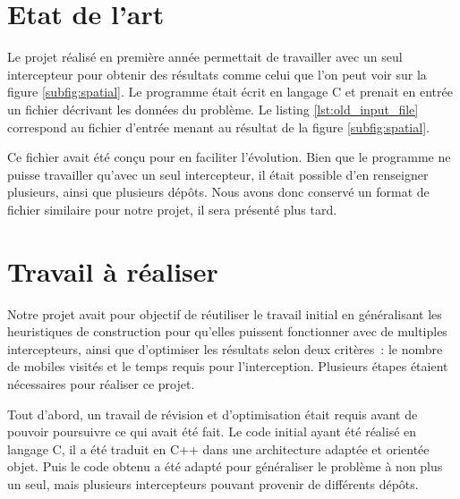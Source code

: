 	\section{Etat de l'art}

		Le projet réalisé en première année permettait de travailler avec un seul intercepteur pour obtenir des résultats comme celui que l'on peut voir sur la figure \ref{subfig:spatial}. Le programme était écrit en langage C et prenait en entrée un fichier décrivant les données du problème. Le listing \ref{lst:old_input_file} correspond au fichier d'entrée menant au résultat de la figure \ref{subfig:spatial}.

		Ce fichier avait été conçu pour en faciliter l'évolution. Bien que le programme ne puisse travailler qu'avec un seul intercepteur, il était possible d'en renseigner plusieurs, ainsi que plusieurs dépôts. Nous avons donc conservé un format de fichier similaire pour notre projet, il sera présenté plus tard.

		\begin{code}
			\label{lst:old_input_file}
		\end{code}

	\section{Travail à réaliser}
		Notre projet avait pour objectif de réutiliser le travail initial en généralisant les heuristiques de construction pour qu'elles puissent fonctionner avec de multiples intercepteurs, ainsi que d'optimiser les résultats selon deux critères : le nombre de mobiles visités et le temps requis pour l'interception.
Plusieurs étapes étaient nécessaires pour réaliser ce projet.

Tout d'abord, un travail de révision et d'optimisation était requis avant de pouvoir poursuivre ce qui avait été fait. Le code initial ayant été réalisé en langage C, il a été traduit en C++ dans une architecture adaptée et orientée objet. Puis le code obtenu a été adapté pour généraliser le problème à non plus un seul, mais plusieurs intercepteurs pouvant provenir de différents dépôts.


